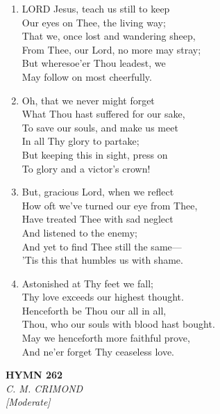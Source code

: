 \begin{enumerate}
    \item LORD Jesus, teach us still to keep \\
        Our eyes on Thee, the living way; \\
        That we, once lost and wandering sheep, \\
        From Thee, our Lord, no more may stray; \\
        But wheresoe'er Thou leadest, we \\
        May follow on most cheerfully.

    \item Oh, that we never might forget \\
        What Thou hast suffered for our sake, \\
        To save our souls, and make us meet \\
        In all Thy glory to partake; \\
        But keeping this in sight, press on \\
        To glory and a victor's crown!

    \item But, gracious Lord, when we reflect \\
        How oft we've turned our eye from Thee, \\
        Have treated Thee with sad neglect \\
        And listened to the enemy; \\
        And yet to find Thee still the same--- \\
        'Tis this that humbles us with shame.

    \item Astonished at Thy feet we fall; \\
        Thy love exceeds our highest thought. \\
        Henceforth be Thou our all in all, \\
        Thou, who our souls with blood hast bought. \\
        May we henceforth more faithful prove, \\
        And ne'er forget Thy ceaseless love.

\end{enumerate}

\newpage
\begin{center}
    {\Large \textbf{HYMN 262}}
    \\
    \textit{C. M. CRIMOND}
    \\
    \textit{\small [Moderate]}
\end{center}
\vspace{1em}

